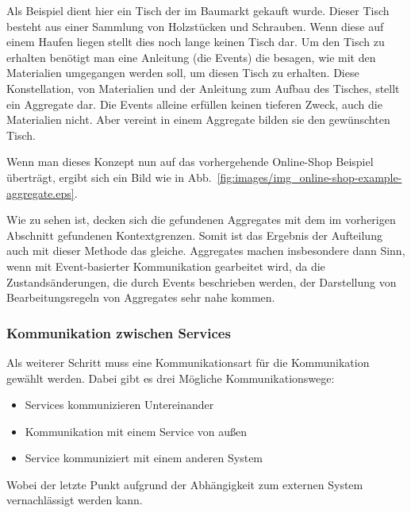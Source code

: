 \documentclass[12pt,a4paper,bibliography=totocnumbered,listof=totocnumbered]{scrartcl}
\begin{document}
Als Beispiel dient hier ein Tisch der im Baumarkt gekauft wurde. Dieser Tisch besteht aus einer Sammlung von Holzstücken und Schrauben. Wenn diese auf einem Haufen liegen stellt dies noch lange keinen Tisch dar. Um den Tisch zu erhalten benötigt man eine Anleitung (die Events) die besagen, wie mit den Materialien umgegangen werden soll, um diesen Tisch zu erhalten. Diese Konstellation, von Materialien und der Anleitung zum Aufbau des Tisches, stellt ein Aggregate dar. Die Events alleine erfüllen keinen tieferen Zweck, auch die Materialien nicht. Aber vereint in einem Aggregate bilden sie den gewünschten Tisch.\cite{mogosanu}

Wenn man dieses Konzept nun auf das vorhergehende Online-Shop Beispiel überträgt, ergibt sich ein Bild wie in Abb.~\ref{fig:images/img_online-shop-example-aggregate.eps}.


Wie zu sehen ist, decken sich die gefundenen Aggregates mit dem im vorherigen Abschnitt gefundenen Kontextgrenzen. Somit ist das Ergebnis der Aufteilung auch mit dieser Methode das gleiche. Aggregates machen insbesondere dann Sinn, wenn mit Event-basierter Kommunikation gearbeitet wird, da die Zustandsänderungen, die durch Events beschrieben werden, der Darstellung von Bearbeitungsregeln von Aggregates sehr nahe kommen.

\subsubsection{Kommunikation zwischen Services}

Als weiterer Schritt muss eine Kommunikationsart für die Kommunikation gewählt werden. Dabei gibt es drei Mögliche Kommunikationswege:

\begin{itemize}
	\item Services kommunizieren Untereinander
	\item Kommunikation mit einem Service von außen
	\item Service kommuniziert mit einem anderen System
\end{itemize}

Wobei der letzte Punkt aufgrund der Abhängigkeit zum externen System vernachlässigt werden kann.
\end{document}
